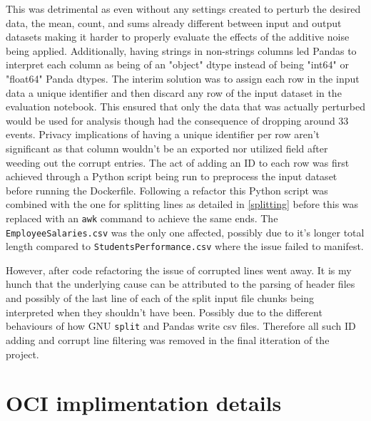 This was detrimental as even without any settings created to perturb the desired data, the mean, count, and sums already different between input and output datasets making it harder to properly evaluate the effects of the additive noise being applied. Additionally, having strings in non-strings columns led Pandas to interpret each column as being of an "object" dtype instead of being "int64" or "float64" Panda dtypes. The interim solution was to assign each row in the input data a unique identifier and then discard any row of the input dataset in the evaluation notebook. This ensured that only the data that was actually perturbed would be used for analysis though had the consequence of dropping around 33 events. Privacy implications of having a unique identifier per row aren't significant as that column wouldn't be an exported nor utilized field after weeding out the corrupt entries. The act of adding an ID to each row was first achieved through a Python script being run to preprocess the input dataset before running the Dockerfile. Following a refactor this Python script was combined with the one for splitting lines as detailed in \ref{splitting} before this was replaced with an \texttt{awk} command to achieve the same ends. The \texttt{EmployeeSalaries.csv} was the only one affected, possibly due to it's longer total length compared to \texttt{StudentsPerformance.csv} where the issue failed to manifest.

However, after code refactoring the issue of corrupted lines went away. It is my hunch that the underlying cause can be attributed to the parsing of header files and possibly of the last line of each of the split input file chunks being interpreted when they shouldn't have been. Possibly due to the different behaviours of how GNU \texttt{split} and Pandas write \acrshort{csv} files. Therefore all such ID adding and corrupt line filtering was removed in the final itteration of the project. 

\section{OCI implimentation details}
